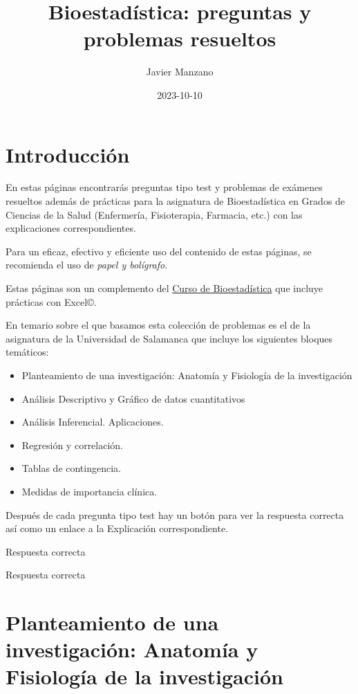 \documentclass[
]{book}
\title{Bioestadística: preguntas y problemas resueltos}
\author{Javier Manzano}
\date{2023-10-10}
\begin{document}
\maketitle

{
\setcounter{tocdepth}{1}
\tableofcontents
}
\hypertarget{introducciuxf3n}{%
\chapter{Introducción}\label{introducciuxf3n}}

En estas páginas encontrarás preguntas tipo test y problemas de exámenes resueltos además de prácticas para la asignatura de Bioestadística en Grados de Ciencias de la Salud (Enfermería, Fisioterapia, Farmacia, etc.) con las explicaciones correspondientes.

Para un eficaz, efectivo y eficiente uso del contenido de estas páginas, se recomienda el uso de \emph{papel y bolígrafo}.

Estas páginas son un complemento del \href{https://1fjmanzano.github.io/bioestadistica/}{Curso de Bioestadística} que incluye prácticas con Excel©.

En temario sobre el que basamos esta colección de problemas es el de la asignatura de la Universidad de Salamanca que incluye los siguientes bloques temáticos:

\begin{itemize}
\item
  Planteamiento de una investigación: Anatomía y Fisiología de la investigación
\item
  Análisis Descriptivo y Gráfico de datos cuantitativos
\item
  Análisis Inferencial. Aplicaciones.
\item
  Regresión y correlación.
\item
  Tablas de contingencia.
\item
  Medidas de importancia clínica.
\end{itemize}

Después de cada pregunta tipo test hay un botón para ver la respuesta correcta así como un enlace a la Explicación correspondiente.

Respuesta correcta

Respuesta correcta

\hypertarget{planteamiento-de-una-investigaciuxf3n-anatomuxeda-y-fisiologuxeda-de-la-investigaciuxf3n}{%
\chapter{Planteamiento de una investigación: Anatomía y Fisiología de la investigación}\label{planteamiento-de-una-investigaciuxf3n-anatomuxeda-y-fisiologuxeda-de-la-investigaciuxf3n}}
\end{document}
